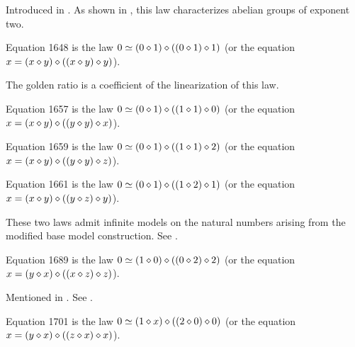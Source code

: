Introduced in \cite{mendelsohn-padmanabhan}.  As shown in , this law characterizes abelian groups of exponent two.

\begin{definition}[Equation 1648]\label{eq1648}\leanok{}  Equation 1648 is the law $0 \simeq  (0 \diamond 1) \diamond ((0 \diamond 1) \diamond 1)$ (or the equation $x = (x \diamond y) \diamond ((x \diamond y) \diamond y)$).
\end{definition}

The golden ratio is a coefficient of the linearization of this law.

\begin{definition}[Equation 1657]\label{eq1657}\leanok{}  Equation 1657 is the law $0 \simeq  (0 \diamond 1) \diamond ((1 \diamond 1) \diamond 0)$ (or the equation $x = (x \diamond y) \diamond ((y \diamond y) \diamond x)$).
\end{definition}

\begin{definition}[Equation 1659]\label{eq1659}\leanok{}  Equation 1659 is the law $0 \simeq  (0 \diamond 1) \diamond ((1 \diamond 1) \diamond 2)$ (or the equation $x = (x \diamond y) \diamond ((y \diamond y) \diamond z)$).
\end{definition}

\begin{definition}[Equation 1661]\label{eq1661}\leanok{}  Equation 1661 is the law $0 \simeq  (0 \diamond 1) \diamond ((1 \diamond 2) \diamond 1)$ (or the equation $x = (x \diamond y) \diamond ((y \diamond z) \diamond y)$).
\end{definition}

These two laws admit infinite models on the natural numbers arising from the modified base model construction. See .

\begin{definition}[Equation 1689]\label{eq1689}\leanok{}  Equation 1689 is the law $0 \simeq  (1 \diamond 0) \diamond ((0 \diamond 2) \diamond 2)$ (or the equation $x = (y \diamond x) \diamond ((x \diamond z) \diamond z)$).
\end{definition}

Mentioned in \cite{Kisielewicz2}.  See .

\begin{definition}[Equation 1701]\label{eq1701}\leanok{}  Equation 1701 is the law $0 \simeq  (1 \diamond x) \diamond ((2 \diamond 0) \diamond 0)$ (or the equation $x = (y \diamond x) \diamond ((z \diamond x) \diamond x)$).
\end{definition}

